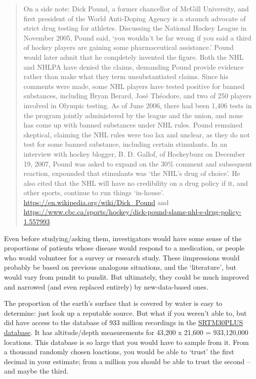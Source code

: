 \documentclass[]{book}
\begin{document}
\begin{quote}
On a side note: Dick Pound, a former chancellor of McGill University, and first president of the World Anti-Doping Agency is a staunch advocate of strict drug testing for athletes.
Discussing the National Hockey League in November 2005, Pound said, `you wouldn't be far wrong if you said a third of hockey players are gaining some pharmaceutical assistance.' Pound would later admit that he completely invented the figure. Both the NHL and NHLPA have denied the claims, demanding Pound provide evidence rather than make what they term unsubstantiated claims. Since his comments were made, some NHL players have tested positive for banned substances, including Bryan Berard, José Théodore, and two of 250 players involved in Olympic testing. As of June 2006, there had been 1,406 tests in the program jointly administered by the league and the union, and none has come up with banned substances under NHL rules. Pound remained skeptical, claiming the NHL rules were too lax and unclear, as they do not test for some banned substance, including certain stimulants. In an interview with hockey blogger, B. D. Gallof, of Hockeybuzz on December 19, 2007, Pound was asked to expand on the 30\% comment and subsequent reaction, expounded that stimulants was `the NHL's drug of choice'. He also cited that the NHL will have no credibility on a drug policy if it, and other sports, continue to run things `in-house'. \url{https://en.wikipedia.org/wiki/Dick_Pound} and \url{https://www.cbc.ca/sports/hockey/dick-pound-slams-nhl-s-drug-policy-1.557993}
\end{quote}

Even before studying/asking them, investigators would have some sense of the proportions of patients whose disease would respond to a medication, or people who would volunteer for a survey or research study. These iimpressions would probably be based on previous analogous situations, and the `literature', but would vary from pundit to pundit. But ultimately, they could be much improved and narrowed (and even replaced entirely) by new-data-based ones.

The proportion of the earth's surface that is covered by water is easy to determine: just look up a reputable source. But what if you weren't able to, but did have access to the database of 933 million recordings in the \href{https://topex.ucsd.edu/cgi-bin/get_srtm30.cg}{SRTM30PLUS database}. It has altitude/depth measurements for 43,200 x 21,600 = 933,120,000 locations. This database is so large that you would have to sample from it. From a thousand randomly chosen loactions, you would be able to `trust' the first decimal in your estimate; from a million you should be able to trust the second -- and maybe the third.
\end{document}
